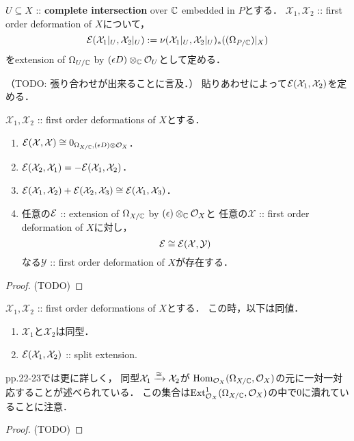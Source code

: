 \documentclass[a4paper]{jsarticle}
\newcommand{\famX}{\mathcal{X}}
\newcommand{\famY}{\mathcal{Y}}
\begin{document}
    \begin{Def}
        $U \subseteq X$ :: \textbf{complete intersection} over $\mathbb{C}$ embedded in $P$とする．
        $\famX_1, \famX_2$ :: first order deformation of $X$について，
        \[ \shE(\famX_1|_U, \famX_2|_U):=\nu(\famX_1|_U, \famX_2|_U)_*((\shDer_{P/\C})|_{X}) \]
        をextension of $\Omega_{U/\mathbb{C}}$ by $(\epsilon D) \otimes_{\mathbb{C}} \mathcal{O}_{U}$として定める．
    \end{Def}
    （TODO: 張り合わせが出来ることに言及．）
    貼りあわせによって$\shE(\famX_1, \famX_2)$を定める．

    \begin{Prop}\label{prop:key1}
        $\famX_1, \famX_2$ :: first order deformations of $X$とする．
        \begin{enumerate}[label=(\alph*), leftmargin=*]
        \item
            $\shE(\famX, \famX) \iso 0_{\shDer_{X/ \C}, (\epsilon D) \otimes \shO_X}$．
        \item
            $\shE(\famX_2, \famX_1)=-\shE(\famX_1, \famX_2)$．
        \item 
            $\shE(\famX_1, \famX_2)+\shE(\famX_2, \famX_3) \iso \shE(\famX_1, \famX_3)$．

        \item
            任意の$\mathcal{E}$ :: extension of $\Omega_{X/\mathbb{C}}$ by $(\epsilon) \otimes_{\mathbb{C}} \mathcal{O}_{X}$と
            任意の$\famX$ :: first order deformation of $X$に対し，
            \[ \shE \iso \shE(\famX, \famY) \]
            なる$\famY$ :: first order deformation of $X$が存在する．
        \end{enumerate}
    \end{Prop}
    \begin{proof}
        (TODO)
    \end{proof}

    \begin{Prop}\label{prop:key2}
        $\famX_1, \famX_2$ :: first order deformations of $X$とする．
        この時，以下は同値．
        \begin{enumerate}
            \item $\famX_1$と$\famX_2$は同型．
            \item $\shE(\famX_1, \famX_2)$ :: split extension.
        \end{enumerate}
    \end{Prop}
    \cite{DefLCI} pp.22-23では更に詳しく，
    同型$\famX_1 \isomap \famX_2$が
    $\operatorname{Hom}_{\mathcal{O}_X}(\Omega_{X/\mathbb{C}}, \mathcal{O}_X)$の元に一対一対応することが述べられている．
    この集合は$\operatorname{Ext}^1_{\mathcal{O}_X}(\Omega_{X/\mathbb{C}}, \mathcal{O}_X)$の中で$0$に潰れていることに注意．
    \begin{proof}
        (TODO)
    \end{proof}
\end{document}
